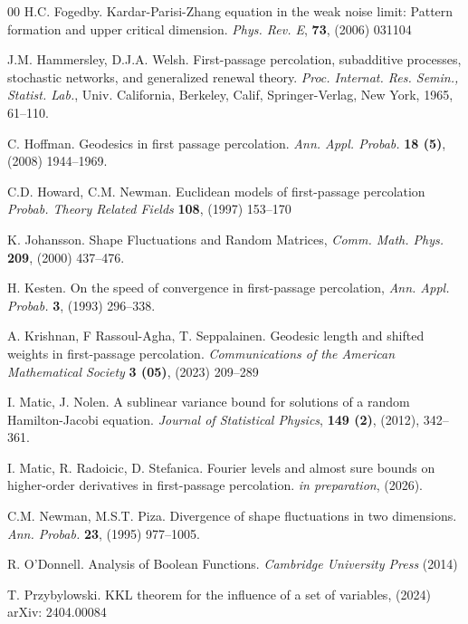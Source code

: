 \documentclass[reqno]{amsart}
\begin{document}
\begin{thebibliography}{00}
 H.C. Fogedby. Kardar-Parisi-Zhang equation in the weak noise limit: Pattern formation and upper
critical dimension. {\em Phys. Rev. E}, {\bf 73}, (2006) 031104

 J.M. Hammersley, D.J.A. Welsh. First-passage percolation, subadditive
processes, stochastic networks, and generalized renewal theory. {\em Proc. Internat.
Res. Semin., Statist. Lab.}, Univ. California, Berkeley, Calif, Springer-Verlag,
New York, 1965, 61--110. 

 C. Hoffman. Geodesics in first passage percolation. {\em 
Ann. Appl. Probab.} {\bf 18 (5)}, (2008) 1944--1969.

 C.D. Howard, C.M. Newman. Euclidean models of first-passage percolation
{\em Probab. Theory Related Fields} {\bf 108}, (1997) 153--170

 K. Johansson. Shape Fluctuations and Random Matrices, {\em Comm. Math. Phys.} {\bf 209}, (2000) 437--476.

 H. Kesten. On the speed of convergence in first-passage percolation, {\em Ann. Appl.
Probab.} {\bf 3}, (1993) 296--338.

 A. Krishnan, F Rassoul-Agha, T. Seppalainen. Geodesic length and shifted weights in first-passage percolation.
{\em Communications of the American Mathematical Society} {\bf 3 (05)}, (2023) 209--289



 I. Matic, J. Nolen. A sublinear variance bound for solutions of a random Hamilton-Jacobi equation.
{\em 
Journal of Statistical Physics}, {\bf 149 (2)}, (2012), 342--361.

 I. Matic, R. Radoicic, D. Stefanica. Fourier levels and almost sure bounds on higher-order derivatives in first-passage percolation.  {\em in preparation},  (2026).

 C.M. Newman, M.S.T. Piza. Divergence of shape fluctuations in two dimensions. 
{\em Ann. Probab.} {\bf 23}, (1995) 977--1005.

 R. O'Donnell. Analysis of Boolean Functions. {\em Cambridge University Press} (2014)

T. Przybylowski. KKL theorem for the influence of a set of variables, 
(2024) arXiv: 2404.00084




\end{thebibliography}
\end{document}
